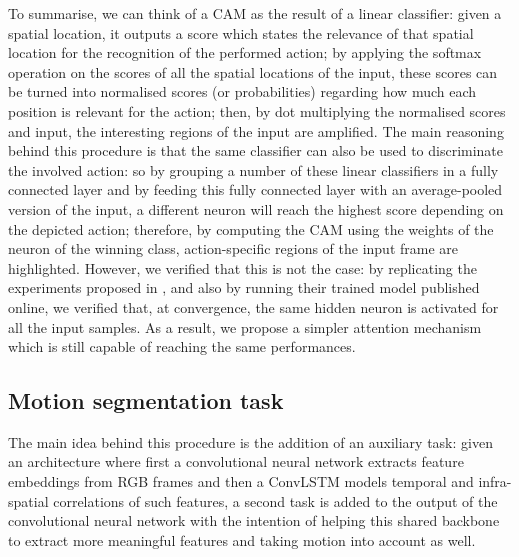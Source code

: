 \documentclass[10pt,twocolumn,letterpaper]{article}
\begin{document}
To summarise, we can think of a CAM as the result of a linear classifier: given a spatial location, it outputs a score which states the relevance of that spatial location for the recognition of the performed action; by applying the softmax operation on the scores of all the spatial locations of the input, these scores can be turned into normalised scores (or probabilities) regarding how much each position is relevant for the action; then, by dot multiplying the normalised scores and input, the interesting regions of the input are amplified. The main reasoning behind this procedure is that the same classifier can also be used to discriminate the involved action: so by grouping a number of these linear classifiers in a fully connected layer and by feeding this fully connected layer with an average-pooled version of the input, a different neuron will reach the highest score depending on the depicted action; therefore, by computing the CAM using the weights of the neuron of the winning class, action-specific regions of the input frame are highlighted. However, we verified that this is not the case: by replicating the experiments proposed in \cite{Ego-RNN}, and also by running their trained model published online, we verified that, at convergence, the same hidden neuron is activated for all the input samples. As a result, we propose a simpler attention mechanism which is still capable of reaching the same performances.


\subsection{Motion segmentation task}
The main idea behind this procedure is the addition of an auxiliary task: given an architecture where first a convolutional neural network extracts feature embeddings from RGB frames and then a ConvLSTM models temporal and infra-spatial correlations of such features, a second task is added to the output of the convolutional neural network with the intention of helping this shared backbone to extract more meaningful features and taking motion into account as well.
\end{document}
